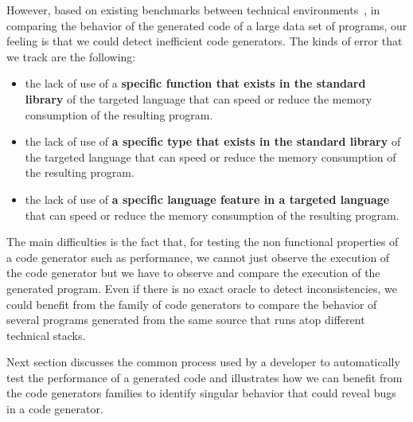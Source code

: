 However, based on existing benchmarks between technical environments~\cite{hundt2011loop}, in comparing the behavior of the generated code of a large data set of programs, our feeling is that we could detect inefficient code generators. The kinds of error that we track are the following:
\begin{itemize}
	\item  the lack of use of a \textbf{specific function that exists in the standard library} of the targeted language  that can speed or reduce the memory consumption of the resulting program.
	\item the lack of use of \textbf{a specific type that exists in the standard library} of the targeted language  that can speed or reduce the memory consumption of the resulting program.
	\item  the lack of use of\textbf{ a specific language feature in a targeted language}  that can speed or reduce the memory consumption of the resulting program. 
\end{itemize}

The main difficulties is the fact that, for testing the non functional properties of a code generator such as performance, we cannot just observe the execution of the code generator but we have to observe and compare the execution of the generated program. Even if there is no exact oracle to detect inconsistencies, we could benefit from the family of code generators to compare the behavior of several programs generated from the same source that runs atop different technical stacks. 

Next section discusses the common process used by a developer to automatically test the performance of a generated code and illustrates how we can benefit from the code generators families to identify singular behavior that could reveal bugs in a code generator. 





 



